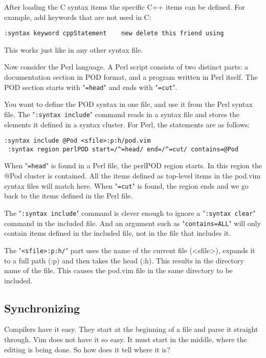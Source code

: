 After loading the C syntax items the specific C++ items can be defined.
For example, add keywords that are not used in C:

\begin{Verbatim}[samepage=true]
 :syntax keyword cppStatement    new delete this friend using
\end{Verbatim}

This works just like in any other syntax file.

Now consider the Perl language.
A Perl script consists of two distinct parts: a documentation section in POD format, and a program written in Perl itself.
The POD section starts with "\texttt{=head}" and ends with "\texttt{=cut}".

You want to define the POD syntax in one file, and use it from the Perl syntax file.
The "\texttt{:syntax include}" command reads in a syntax file and stores the elements it defined in a syntax cluster.
For Perl, the statements are as follows:

\begin{Verbatim}[samepage=true]
 :syntax include @Pod <sfile>:p:h/pod.vim
 :syntax region perlPOD start=/^=head/ end=/^=cut/ contains=@Pod
\end{Verbatim}

When "\texttt{=head}" is found in a Perl file, the perlPOD region starts.
In this region the @Pod cluster is contained.
All the items defined as top-level items in the pod.vim syntax files will match here.
When "\texttt{=cut}" is found, the region ends and we go back to the items defined in the Perl file.

The "\texttt{:syntax include}" command is clever enough to ignore a "\texttt{:syntax clear}" command in the included file.
And an argument such as "\texttt{contains=ALL}" will only contain items defined in the included file, not in the file that includes it.

The "\texttt{<sfile>:p:h/}" part uses the name of the current file (<sfile>), expands it to a full path (:p) and then takes the head (:h).
This results in the directory name of the file.
This causes the pod.vim file in the same directory to be included.
\subsection{Synchronizing}
Compilers have it easy.
They start at the beginning of a file and parse it straight through.
Vim does not have it so easy.
It must start in the middle, where the editing is being done.
So how does it tell where it is?

